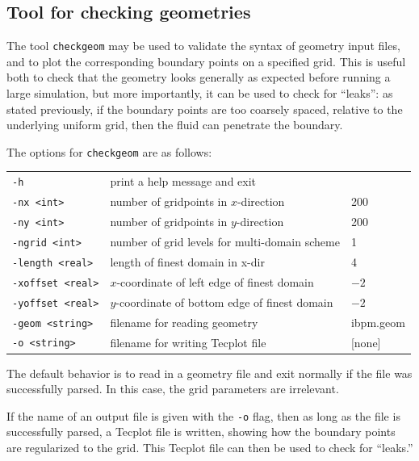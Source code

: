 \documentclass[11pt]{article}
\begin{document}
\subsection{Tool for checking geometries}
\label{sub:tool_for_checking_geometries}
The tool {\tt checkgeom} may be used to validate the syntax of geometry input files, and to plot the corresponding boundary points on a specified grid.  This is useful both to check that the geometry looks generally as expected before running a large simulation, but more importantly, it can be used to check for ``leaks'': as stated previously, if the boundary points are too coarsely spaced, relative to the underlying uniform grid, then the fluid can penetrate the boundary.

The options for {\tt checkgeom} are as follows:

\begin{center}
	\begin{tabular}{lll}
	  \verb|-h|                 & print a help message and exit \\
	  \verb|-nx <int>|          & number of gridpoints in $x$-direction & 200 \\
	  \verb|-ny <int>|          & number of gridpoints in $y$-direction & 200 \\
	  \verb|-ngrid <int>|       & number of grid levels for multi-domain scheme & 1 \\
	  \verb|-length <real>|     & length of finest domain in x-dir & 4 \\
	  \verb|-xoffset <real>|    & $x$-coordinate of left edge of finest domain & $-2$ \\
	  \verb|-yoffset <real>|    & $y$-coordinate of bottom edge of finest domain & $-2$ \\
	  \verb|-geom <string>|     & filename for reading geometry & ibpm.geom \\
	  \verb|-o <string>|       & filename for writing Tecplot file & [none]
	\end{tabular}
\end{center}

The default behavior is to read in a geometry file and exit normally if the file was successfully parsed.  In this case, the grid parameters are irrelevant.

If the name of an output file is given with the {\tt -o} flag, then as long as the file is successfully parsed, a Tecplot file is written, showing how the boundary points are regularized to the grid.  This Tecplot file can then be used to check for ``leaks.''
\end{document}
